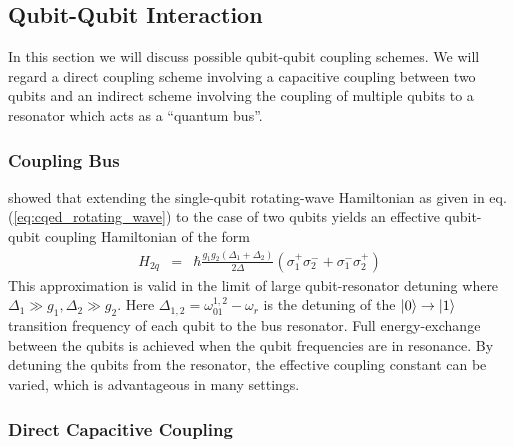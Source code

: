 \subsection{Qubit-Qubit Interaction}

In this section we will discuss possible qubit-qubit coupling schemes. We will regard a direct coupling scheme involving a capacitive coupling between two qubits and an indirect scheme involving the coupling of multiple qubits to a resonator which acts as a ``quantum bus''.

\subsubsection{Coupling Bus}

\citep{blais_quantum-information_2007} showed that extending the single-qubit rotating-wave Hamiltonian as given in eq. (\ref{eq:cqed_rotating_wave}) to the case of two qubits yields an effective qubit-qubit coupling Hamiltonian of the form
%
\begin{eqnarray}
H_{2q} & = & \hbar\frac{g_1 g_2(\Delta_1+\Delta_2)}{2\Delta}(\sigma_1^+\sigma_2^-+\sigma_1^-\sigma_2^+) \label{eq:cqed_bus_coupling}
\end{eqnarray}
%
This approximation is valid in the limit of large qubit-resonator detuning where $\Delta_1 \gg g_1,\Delta_2 \gg g_2$. Here $\Delta_{1,2} = \omega_{01}^{1,2}-\omega_r$ is the detuning of the $\left| 0 \right>\to\left| 1 \right>$ transition frequency of each qubit to the bus resonator. Full energy-exchange between the qubits is achieved when the qubit frequencies are in resonance. By detuning the qubits from the resonator, the effective coupling constant can be varied, which is advantageous in many settings. 
\subsubsection{Direct Capacitive Coupling}

